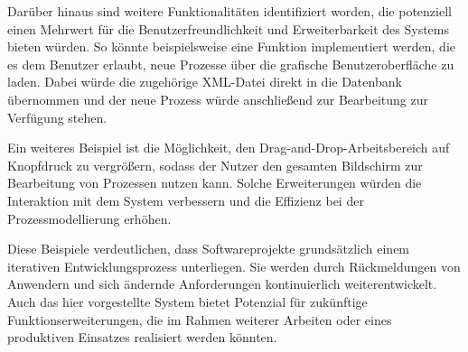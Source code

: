 Darüber hinaus sind weitere Funktionalitäten identifiziert worden, die potenziell einen Mehrwert für die Benutzerfreundlichkeit und Erweiterbarkeit des Systems bieten würden. So könnte beispielsweise eine Funktion implementiert werden, die es dem Benutzer erlaubt, neue Prozesse über die grafische Benutzeroberfläche zu laden. Dabei würde die zugehörige XML-Datei direkt in die Datenbank übernommen und der neue Prozess würde anschließend zur Bearbeitung zur Verfügung stehen.

Ein weiteres Beispiel ist die Möglichkeit, den Drag-and-Drop-Arbeitsbereich auf Knopfdruck zu vergrößern, sodass der Nutzer den gesamten Bildschirm zur Bearbeitung von Prozessen nutzen kann. Solche Erweiterungen würden die Interaktion mit dem System verbessern und die Effizienz bei der Prozessmodellierung erhöhen.

Diese Beispiele verdeutlichen, dass Softwareprojekte grundsätzlich einem iterativen Entwicklungsprozess unterliegen. Sie werden durch Rückmeldungen von Anwendern und sich ändernde Anforderungen kontinuierlich weiterentwickelt. Auch das hier vorgestellte System bietet Potenzial für zukünftige Funktionserweiterungen, die im Rahmen weiterer Arbeiten oder eines produktiven Einsatzes realisiert werden könnten.




